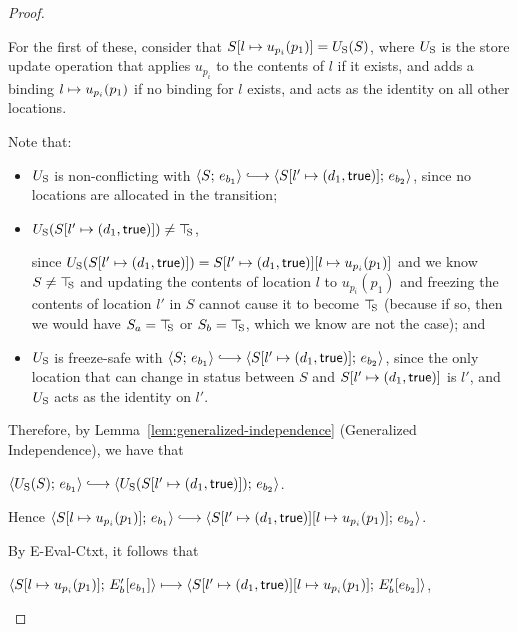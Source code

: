 \begin{proof}
\begin{enumerate}
\begin{enumerate}
\begin{itemize}
        For the first of these, consider that
        $S[l \mapsto u_{p_i}(p_1)] = U_{\mathrm{S}}(S)$, where $U_{\mathrm{S}}$ is the
        store update operation that applies $u_{p_i}$ to the
        contents of $l$ if it exists, and adds a binding
        $l \mapsto u_{p_i}(p_1)$ if no binding for $l$
        exists, and acts as the identity on all other locations.

        Note that:
        \begin{itemize}
        \item $U_{\mathrm{S}}$ is non-conflicting with $\config{S}{e_{b_1}}
          \parstepsto
          \config{\extS{S}{l'}{d_1}{\frozentrue}}{e_{b_2}}$, since
          no locations are allocated in the transition;
        \item $U_{\mathrm{S}}(S[l' \mapsto (d_1, \textsf{true})]) \neq \top\hspace{-0.85mm}_{\mathrm{S}}$,

          since $U_{\mathrm{S}}(S[l' \mapsto (d_1, \textsf{true})]) =
          S[l' \mapsto (d_1, \textsf{true})][l \mapsto u_{p_i}(p_1)]$
          and we know $S \neq \top\hspace{-0.85mm}_{\mathrm{S}}$ and updating the contents of
          location $l$ to $u_{p_i}(p_1)$ and freezing the contents
          of location $l'$ in $S$ cannot cause it to become $\top\hspace{-0.85mm}_{\mathrm{S}}$
          (because if so, then we would have $S_a = \top\hspace{-0.85mm}_{\mathrm{S}}$ or $S_b =
          \top\hspace{-0.85mm}_{\mathrm{S}}$, which we know are not the case); and
        \item $U_{\mathrm{S}}$ is freeze-safe with $\config{S}{e_{b_1}}
          \parstepsto
          \config{\extS{S}{l'}{d_1}{\frozentrue}}{e_{b_2}}$, since
          the only location that can change in status between $S$
          and $S[l' \mapsto (d_1, \textsf{true})]$ is $l'$, and $U_{\mathrm{S}}$
          acts as the identity on $l'$.
        \end{itemize}
        Therefore, by Lemma~\ref{lem:generalized-independence}
        (Generalized Independence), we have that

        $\config{\Ustore(S)}{e_{b_1}} \parstepsto
        \config{\Ustore(\extS{S}{l'}{d_1}{\frozentrue})}{e_{b_2}}$.

        Hence $\config{\extSRaw{S}{l}{u_{p_i}(p_1)}}{e_{b_1}}
        \parstepsto
        \config{\extSRaw{\extS{S}{l'}{d_1}{\frozentrue}}{l}{u_{p_i}(p_1)}}{e_{b_2}}$.

        By {\sc E-Eval-Ctxt}, it follows that

        $\langle S[l \mapsto u_{p_i}(p_1)];\, E'_b\hspace{-0.5mm}\left[e_{b_1}\right] \rangle
        \longmapsto
        \langle S[l' \mapsto (d_1, \textsf{true})][l \mapsto u_{p_i}(p_1)];\, E'_b\hspace{-0.5mm}\left[e_{b_2}\right] \rangle$,
        

\end{itemize}
\end{enumerate}
\end{enumerate}
\end{proof}
